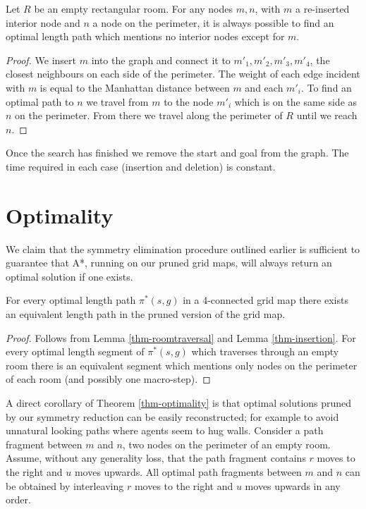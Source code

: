 \begin{lemma}
\label{thm-insertion}
Let $R$ be an empty rectangular room.
For any nodes $m, n$, with $m$ a re-inserted interior node and $n$ a node on the perimeter,
it is always possible to find an optimal length path which mentions no interior nodes except for $m$.
\end{lemma}
\begin{proof}
We insert $m$ into the graph and connect it to 
$m'_{1}, m'_{2}, m'_{3}, m'_{4}$, the closest neighbours on 
each side of the perimeter.
The weight of each edge incident with $m$ is equal to the Manhattan distance between
$m$ and each $m'_{i}$.
To find an optimal path to $n$ we travel from $m$ to the node $m'_{i}$ which is 
on the same side as $n$ on the perimeter.
From there we travel along the perimeter of $R$ until we reach $n$.
\end{proof}

Once the search has finished we remove the start and goal from the graph.
The time required in each case (insertion and deletion) is constant.

\section{Optimality}
We claim that the symmetry elimination procedure outlined earlier is sufficient to 
guarantee that A*, running on our pruned grid maps, will always return an optimal solution if one exists.

\begin{theorem}
\label{thm-optimality}
For every optimal length path $\pi^*(s, g)$ in a 4-connected grid map there exists
an equivalent length path in the pruned version of the grid map.
\end{theorem}
\begin{proof}
Follows from Lemma \ref{thm-roomtraversal} and Lemma \ref{thm-insertion}.
For every optimal length segment of $\pi^{*}(s, g)$ which traverses
through an empty room there is an equivalent segment which mentions only nodes
on the perimeter of each room (and possibly one macro-step).
\end{proof}

A direct corollary of Theorem \ref{thm-optimality} is that optimal solutions
pruned by our symmetry reduction can be easily reconstructed; for example to
avoid unnatural looking paths where agents seem to hug walls.
Consider a path fragment between $m$ and $n$, two nodes on the perimeter of an empty room.
Assume, without any generality loss, that the path fragment contains $r$ moves to the right and $u$ moves upwards.
All optimal path fragments between $m$ and $n$ can be obtained by interleaving $r$ moves to the right
and $u$ moves upwards in any order.


